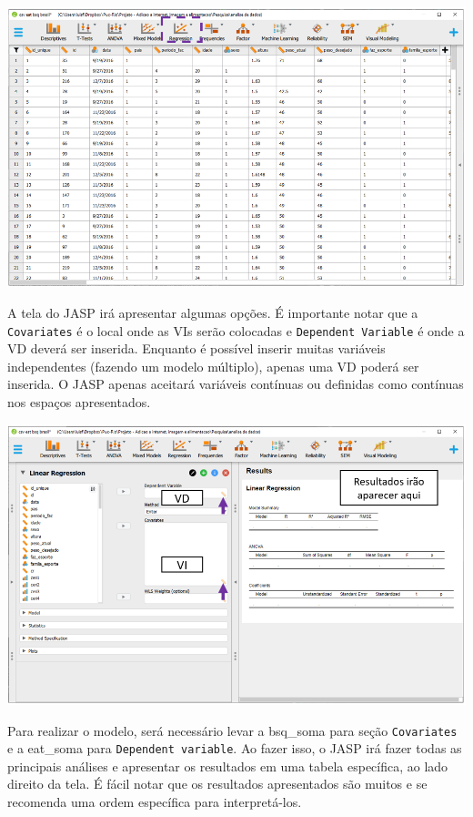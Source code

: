 \documentclass[
]{book}
\begin{document}
\includegraphics{./img/cap_reg_multipla_interface.png}

A tela do JASP irá apresentar algumas opções. É importante notar que a \texttt{Covariates} é o local onde as VIs serão colocadas e \texttt{Dependent\ Variable} é onde a VD deverá ser inserida. Enquanto é possível inserir muitas variáveis independentes (fazendo um modelo múltiplo), apenas uma VD poderá ser inserida. O JASP apenas aceitará variáveis contínuas ou definidas como contínuas nos espaços apresentados.

\includegraphics{./img/cap_reg_interface.png}

Para realizar o modelo, será necessário levar a bsq\_soma para seção \texttt{Covariates} e a eat\_soma para \texttt{Dependent\ variable}. Ao fazer isso, o JASP irá fazer todas as principais análises e apresentar os resultados em uma tabela específica, ao lado direito da tela. É fácil notar que os resultados apresentados são muitos e se recomenda uma ordem específica para interpretá-los.
\end{document}
